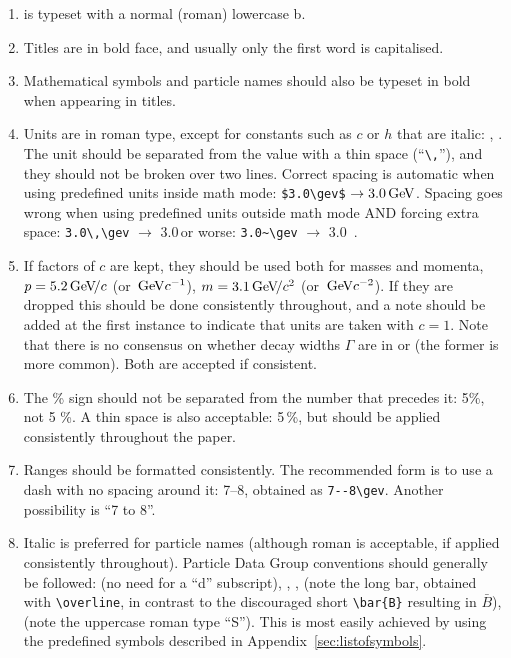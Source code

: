 \begin{enumerate}

\item \lhcb is typeset with a normal (roman) lowercase b.

\item Titles are in bold face, and usually only the first word is
  capitalised.

\item Mathematical symbols and particle names should also be typeset
  in bold when appearing in titles.

\item Units are in roman type, except for constants such as $c$ or $h$
  that are italic: \gev, \gevcc.  The unit should be separated from
  the value with a thin space (``\verb!\,!''),
  and they should not be broken over two lines.
  Correct spacing is automatic when using predefined units inside math mode: \verb!$3.0\gev$! $\rightarrow 3.0\text{\,Ge\kern -0.1em V}$.
  Spacing goes wrong when using predefined units outside math mode AND forcing extra space:
  \verb!3.0\,\gev! $\to$ 3.0\,\gev or worse:   \verb!3.0~\gev! $\to$ 3.0~\gev. 

\item  If factors of $c$ are kept, they should be used both for masses and
  momenta, \eg $p=5.2\text{\,Ge\kern -0.1em V\!/}c$ (or $\text{\,Ge\kern -0.1em V} c^{-1}$), $m = 3.1\text{\,Ge\kern -0.1em V\!/}c^2$ (or $\text{\,Ge\kern -0.1em V} c^{-2}$). If they are dropped this
  should be done consistently throughout, and a note should be added
  at the first instance to indicate that units are taken with $c=1$.
  Note that there is no consensus on whether decay widths $\Gamma$ are
  in \mev or \mevcc (the former is more common).
  Both are accepted if consistent. 

\item The \% sign should not be separated from the number that precedes it: 5\%, not 5 \%. 
A thin space is also acceptable: 5\,\%, but should be applied consistently throughout the paper.

\item Ranges should be formatted consistently. The recommended form is to use a dash with no spacing around it: 
7--8\gev, obtained as \verb!7--8\gev!. Another possibility is ``7 to 8\gev''.

\item Italic is preferred for particle names (although roman is
  acceptable, if applied consistently throughout).  Particle Data
  Group conventions should generally be followed: \Bd (no need for a
  ``d'' subscript), \decay{\Bs}{\jpsi\phi}, \Bsb,
  (note the long bar, obtained with \verb!\overline!, in contrast to the discouraged short \verb!\bar{B}! resulting in $\bar{B}$), \KS (note the
  uppercase roman type ``S''). 
  This is most easily achieved by using the predefined symbols described in 
  Appendix~\ref{sec:listofsymbols}.


\end{enumerate}
